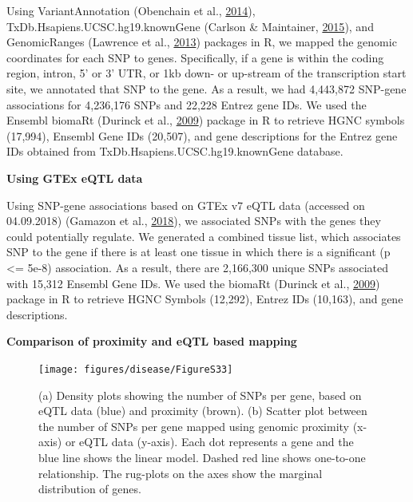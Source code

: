 \documentclass[12pt,twoside]{unicam}
\begin{document}
Using VariantAnnotation (Obenchain et al., \protect\hyperlink{ref-Obenchain2014}{2014}), TxDb.Hsapiens.UCSC.hg19.knownGene (Carlson \& Maintainer, \protect\hyperlink{ref-Carlson2015}{2015}), and GenomicRanges (Lawrence et al., \protect\hyperlink{ref-Lawrence2013}{2013}) packages in R, we mapped the genomic coordinates for each SNP to genes. Specifically, if a gene is within the coding region, intron, 5' or 3' UTR, or 1kb down- or up-stream of the transcription start site, we annotated that SNP to the gene. As a result, we had 4,443,872 SNP-gene associations for 4,236,176 SNPs and 22,228 Entrez gene IDs. We used the Ensembl biomaRt (Durinck et al., \protect\hyperlink{ref-Durinck2009}{2009}) package in R to retrieve HGNC symbols (17,994), Ensembl Gene IDs (20,507), and gene descriptions for the Entrez gene IDs obtained from TxDb.Hsapiens.UCSC.hg19.knownGene database.

\textbf{Using GTEx eQTL data}

Using SNP-gene associations based on GTEx v7 eQTL data (accessed on 04.09.2018) (Gamazon et al., \protect\hyperlink{ref-Gamazon2018}{2018}), we associated SNPs with the genes they could potentially regulate. We generated a combined tissue list, which associates SNP to the gene if there is at least one tissue in which there is a significant (p \textless= 5e-8) association. As a result, there are 2,166,300 unique SNPs associated with 15,312 Ensembl Gene IDs. We used the biomaRt (Durinck et al., \protect\hyperlink{ref-Durinck2009}{2009}) package in R to retrieve HGNC Symbols (12,292), Entrez IDs (10,163), and gene descriptions.

\textbf{Comparison of proximity and eQTL based mapping}

\begin{figure}

{\centering \texttt{[image: figures/disease/FigureS33]} 

}

\caption[Relationships between SNP-gene associations based on proximity and eQTL data.]{(a) Density plots showing the number of SNPs per gene, based on eQTL data (blue) and proximity (brown). (b) Scatter plot between the number of SNPs per gene mapped using genomic proximity (x-axis) or eQTL data (y-axis). Each dot represents a gene and the blue line shows the linear model. Dashed red line shows one-to-one relationship. The rug-plots on the axes show the marginal distribution of genes. }\label{fig:disFigS33}
\end{figure}
\end{document}
